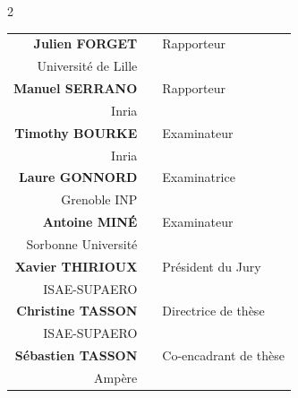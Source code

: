 \begin{titlepage}
\begin{center}
\begin{multicols}{2}
{                \begin{tabular}{rcl}
                    \textbf{Julien FORGET}       &  & Rapporteur            \\
                    {\small Université de Lille} &  &                       \\
                    \textbf{Manuel SERRANO}      &  & Rapporteur            \\
                    {\small Inria}               &  &                       \\
                    \textbf{Timothy BOURKE}      &  & Examinateur           \\
                    {\small Inria}               &  &                       \\
                    \textbf{Laure GONNORD}       &  & Examinatrice          \\
                    {\small Grenoble INP}        &  &                       \\
                    \textbf{Antoine MINÉ}        &  & Examinateur           \\
                    {\small Sorbonne Université} &  &                       \\
                    \textbf{Xavier THIRIOUX}     &  & Président du Jury     \\
                    {\small ISAE-SUPAERO}        &  &                       \\
                    \textbf{Christine TASSON}    &  & Directrice de thèse   \\
                    {\small ISAE-SUPAERO}        &  &                       \\
                    \textbf{Sébastien TASSON}    &  & Co-encadrant de thèse \\
                    {\small Ampère}              &  &
                \end{tabular}
            }

        \end{multicols}
    \end{center}
\end{titlepage}